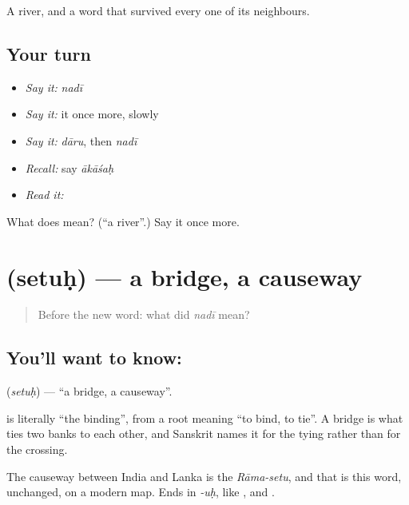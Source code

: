 \begin{grammarlens}[title={What you've built}]
A river, and a word that survived every one of its neighbours.
\end{grammarlens}

\subsection*{Your turn}
\begin{itemize}
\raggedright
  \item \emph{Say it:} \emph{nadī}
  \item \emph{Say it:} it once more, slowly
  \item \emph{Say it:} \emph{dāru}, then \emph{nadī}
  \item \emph{Recall:} say \emph{ākāśaḥ}
  \item \emph{Read it:} \textbf{}
\end{itemize}

\begin{tcolorbox}[breakable,colback=teal!4,colframe=teal!35!black,title={Before you move on}]
What does  mean? (\textquotedblleft{}a river\textquotedblright{}.) Say it once more.
\end{tcolorbox}
\section[\texorpdfstring{\sk{सेतुः} (setuḥ)}{सेतुः (setuḥ)}]{ (setuḥ) — a bridge, a causeway}

\label{lesson:SA-C33-bridge}



\begin{quote}
Before the new word: what did \emph{nadī} mean?
\end{quote}

\subsection*{You'll want to know: }
\textbf{} (\emph{setuḥ}) — \textquotedblleft{}a bridge, a causeway\textquotedblright{}.

\textbf{} is literally \textquotedblleft{}the binding\textquotedblright{}, from a root meaning \textquotedblleft{}to bind, to tie\textquotedblright{}. A bridge is what ties two banks to each other, and Sanskrit names it for the tying rather than for the crossing.

The causeway between India and Lanka is the \emph{Rāma-setu}, and that is this word, unchanged, on a modern map. Ends in \emph{-uḥ}, like \textbf{}, \textbf{} and \textbf{}.

